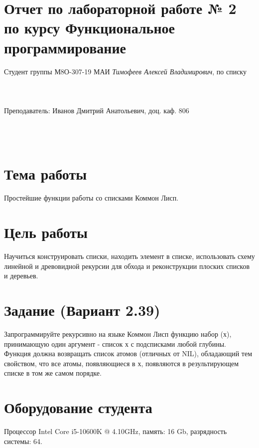 \documentclass[12pt]{article}
\begin{document}
\section*{Отчет по лабораторной работе № 2 \\
по курсу \guillemotleft Функциональное программирование\guillemotright}
\begin{flushright}
Студент группы М8О-307-19 МАИ \textit{Тимофеев Алексей Владимирович},  по списку \\
 \\
 \\
\ \\
Преподаватель: Иванов Дмитрий Анатольевич, доц. каф. 806 \\
 \\
 \\
 \\

\end{flushright}

\section{Тема работы}
Простейшие функции работы со списками Коммон Лисп.

\section{Цель работы}
Научиться конструировать списки, находить элемент в списке, использовать схему линейной и древовидной рекурсии для обхода и реконструкции плоских списков и деревьев.

\section{Задание (Вариант 2.39)}
Запрограммируйте рекурсивно на языке Коммон Лисп функцию набор (х), принимающую один аргумент - список х с подсписками любой глубины.\\

Функция должна возвращать список атомов (отличных от NIL), обладающий тем свойством, что все атомы, появляющиеся в х, появляются в результирующем списке в том же самом порядке.\\


\section{Оборудование студента}
Процессор Intel Core i5-10600K @ 4.10GHz, память: 16 Gb, разрядность системы: 64.
\end{document}
